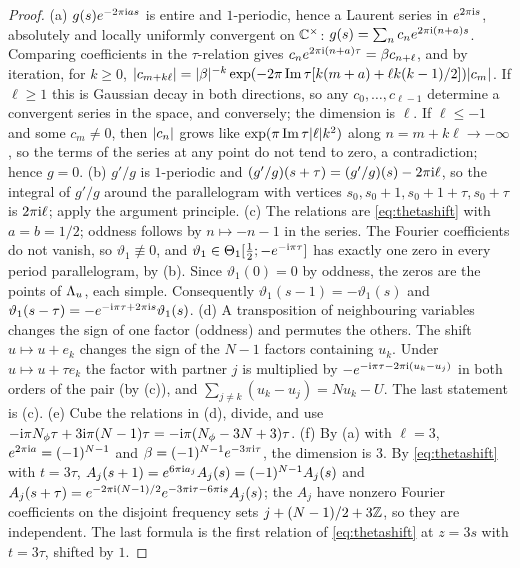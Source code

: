 \begin{proof}
(a) $g(s)e^{-2\pi\mathrm{i} as}$ is entire and $1$-periodic, hence a Laurent series in $e^{2\pi\mathrm{i} s}$, absolutely and locally
uniformly convergent on $\mathbb{C}^\times$: $g(s)=\sum_nc_ne^{2\pi\mathrm{i}(n+a)s}$. Comparing coefficients in the $\tau$-relation gives
$c_ne^{2\pi\mathrm{i}(n+a)\tau}=\beta c_{n+\ell}$, and by iteration, for $k\ge0$,
$\lvert c_{m+k\ell}\rvert=\lvert\beta\rvert^{-k}\exp(-2\pi\operatorname{Im}\tau[k(m+a)+\ell k(k-1)/2])\lvert c_m\rvert$. If $\ell\ge1$ this is Gaussian decay
in both directions, so any $c_0,\dots,c_{\ell-1}$ determine a convergent series in the space, and conversely; the dimension is
$\ell$. If $\ell\le-1$ and some $c_m\neq0$, then $\lvert c_n\rvert$ grows like $\exp(\pi\operatorname{Im}\tau\lvert\ell\rvert k^2)$ along
$n=m+k\ell\to-\infty$, so the terms of the series at any point do not tend to zero, a contradiction; hence $g=0$.
(b) $g'/g$ is $1$-periodic and $(g'/g)(s+\tau)=(g'/g)(s)-2\pi\mathrm{i}\ell$, so the integral of $g'/g$ around the parallelogram with
vertices $s_0,s_0+1,s_0+1+\tau,s_0+\tau$ is $2\pi\mathrm{i}\ell$; apply the argument principle.
(c) The relations are \eqref{eq:thetashift} with $a=b=1/2$; oddness follows by $n\mapsto-n-1$ in the series. The Fourier
coefficients do not vanish, so $\vartheta_1\not\equiv0$, and $\vartheta_1\in\Theta_1[\tfrac12;-e^{-\mathrm{i}\pi\tau}]$ has exactly one zero in
every period parallelogram, by (b). Since $\vartheta_1(0)=0$ by oddness, the zeros are the points of $\Lambda_u$, each simple.
Consequently $\vartheta_1(s-1)=-\vartheta_1(s)$ and $\vartheta_1(s-\tau)=-e^{-\mathrm{i}\pi\tau+2\pi\mathrm{i} s}\vartheta_1(s)$.
(d) A transposition of neighbouring variables changes the sign of one factor (oddness) and permutes the others. The
shift $u\mapsto u+e_k$ changes the sign of the $N-1$ factors containing $u_k$. Under $u\mapsto u+\tau e_k$ the factor with
partner $j$ is multiplied by $-e^{-\mathrm{i}\pi\tau-2\pi\mathrm{i}(u_k-u_j)}$ in both orders of the pair (by (c)), and
$\sum_{j\neq k}(u_k-u_j)=Nu_k-U$. The last statement is (c).
(e) Cube the relations in (d), divide, and use $-\mathrm{i}\pi N_{\phi}\tau+3\mathrm{i}\pi(N-1)\tau=-\mathrm{i}\pi(N_{\phi}-3N+3)\tau$.
(f) By (a) with $\ell=3$, $e^{2\pi\mathrm{i} a}=(-1)^{N-1}$ and $\beta=(-1)^{N-1}e^{-3\pi\mathrm{i}\tau}$, the dimension is $3$. By
\eqref{eq:thetashift} with $t=3\tau$, $A_j(s+1)=e^{6\pi\mathrm{i} a_j}A_j(s)=(-1)^{N-1}A_j(s)$ and
$A_j(s+\tau)=e^{-2\pi\mathrm{i}(N-1)/2}e^{-3\pi\mathrm{i}\tau-6\pi\mathrm{i} s}A_j(s)$; the $A_j$ have nonzero Fourier coefficients on the disjoint
frequency sets $j+(N-1)/2+3\mathbb{Z}$, so they are independent. The last formula is the first relation of \eqref{eq:thetashift}
at $z=3s$ with $t=3\tau$, shifted by $1$.
\end{proof}

